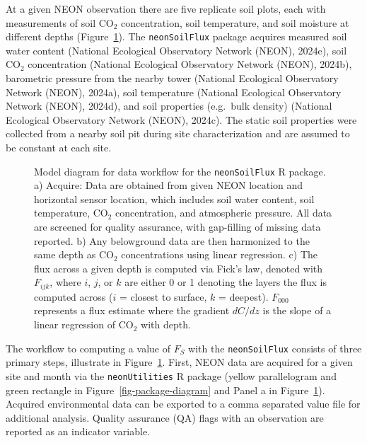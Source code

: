 \documentclass[
  letterpaper,
  DIV=11,
  numbers=noendperiod]{scrartcl}
\begin{document}
At a given NEON observation there are five replicate soil plots, each
with measurements of soil CO\(_{2}\) concentration, soil temperature,
and soil moisture at different depths (Figure~\ref{fig-model-diagram}).
The \texttt{neonSoilFlux} package acquires measured soil water content
(National Ecological Observatory Network (NEON), 2024e), soil CO\(_{2}\)
concentration (National Ecological Observatory Network (NEON), 2024b),
barometric pressure from the nearby tower (National Ecological
Observatory Network (NEON), 2024a), soil temperature (National
Ecological Observatory Network (NEON), 2024d), and soil properties
(e.g.~bulk density) (National Ecological Observatory Network (NEON),
2024c). The static soil properties were collected from a nearby soil pit
during site characterization and are assumed to be constant at each
site.

\begin{figure}


\caption{\label{fig-model-diagram}Model diagram for data workflow for
the \texttt{neonSoilFlux} R package. a) Acquire: Data are obtained from
given NEON location and horizontal sensor location, which includes soil
water content, soil temperature, CO\(_{2}\) concentration, and
atmospheric pressure. All data are screened for quality assurance, with
gap-filling of missing data reported. b) Any belowground data are then
harmonized to the same depth as CO\(_{2}\) concentrations using linear
regression. c) The flux across a given depth is computed via Fick's law,
denoted with \(F_{ijk}\), where \(i\), \(j\), or \(k\) are either 0 or 1
denoting the layers the flux is computed across (\(i\) = closest to
surface, \(k\) = deepest). \(F_{000}\) represents a flux estimate where
the gradient \(dC/dz\) is the slope of a linear regression of CO\(_{2}\)
with depth.}

\end{figure}%

The workflow to computing a value of \(F_{S}\) with the
\texttt{neonSoilFlux} consists of three primary steps, illustrate in
Figure~\ref{fig-model-diagram}. First, NEON data are acquired for a
given site and month via the \texttt{neonUtilities} R package (yellow
parallelogram and green rectangle in Figure~\ref{fig-package-diagram}
and Panel a in Figure~\ref{fig-model-diagram}). Acquired environmental
data can be exported to a comma separated value file for additional
analysis. Quality assurance (QA) flags with an observation are reported
as an indicator variable.
\end{document}
